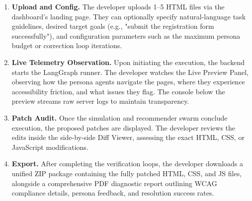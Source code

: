 \begin{enumerate}
  \item \textbf{Upload and Config.} The developer uploads 1--5 HTML files via the dashboard's landing page. They can optionally specify natural-language task guidelines, desired target goals (e.g., "submit the registration form successfully"), and configuration parameters such as the maximum persona budget or correction loop iterations.
  
  \item \textbf{Live Telemetry Observation.} Upon initiating the execution, the backend starts the LangGraph runner. The developer watches the Live Preview Panel, observing how the persona agents navigate the pages, where they experience accessibility friction, and what issues they flag. The console below the preview streams raw server logs to maintain transparency.
  
  \item \textbf{Patch Audit.} Once the simulation and recommender swarm conclude execution, the proposed patches are displayed. The developer reviews the edits inside the side-by-side Diff Viewer, assessing the exact HTML, CSS, or JavaScript modifications.
  
  \item \textbf{Export.} After completing the verification loops, the developer downloads a unified ZIP package containing the fully patched HTML, CSS, and JS files, alongside a comprehensive PDF diagnostic report outlining WCAG compliance details, persona feedback, and resolution success rates.
\end{enumerate}

